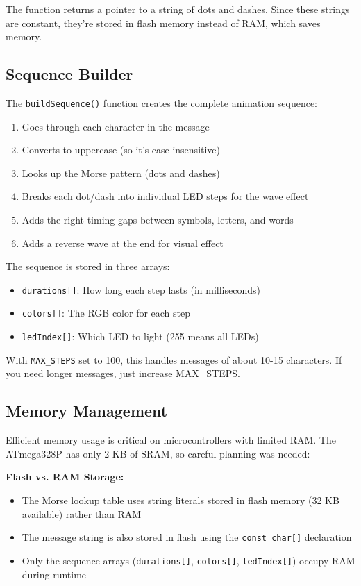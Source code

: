 \documentclass[report]{IEEEtran}
\begin{document}
The function returns a pointer to a string of dots and dashes. 
Since these strings are constant, they're stored in flash memory instead of RAM, which saves memory.

\subsection{Sequence Builder}
The \texttt{buildSequence()} function creates the complete animation sequence:
\begin{enumerate}
    \item Goes through each character in the message
    \item Converts to uppercase (so it's case-insensitive)
    \item Looks up the Morse pattern (dots and dashes)
    \item Breaks each dot/dash into individual LED steps for the wave effect
    \item Adds the right timing gaps between symbols, letters, and words
    \item Adds a reverse wave at the end for visual effect
\end{enumerate}

The sequence is stored in three arrays:
\begin{itemize}
    \item \texttt{durations[]}: How long each step lasts (in milliseconds)
    \item \texttt{colors[]}: The RGB color for each step
    \item \texttt{ledIndex[]}: Which LED to light (255 means all LEDs)
\end{itemize}

With \texttt{MAX\_STEPS} set to 100, this handles messages of about 10-15 characters. If you need longer messages, just increase MAX\_STEPS. 

\subsection{Memory Management}
Efficient memory usage is critical on microcontrollers with limited RAM. The ATmega328P has only 2 KB of SRAM, so careful planning was needed:

\textbf{Flash vs. RAM Storage:}
\begin{itemize}
    \item The Morse lookup table uses string literals stored in flash memory (32 KB available) rather than RAM
    \item The message string is also stored in flash using the \texttt{const char[]} declaration
    \item Only the sequence arrays (\texttt{durations[]}, \texttt{colors[]}, \texttt{ledIndex[]}) occupy RAM during runtime
\end{itemize}
\end{document}
